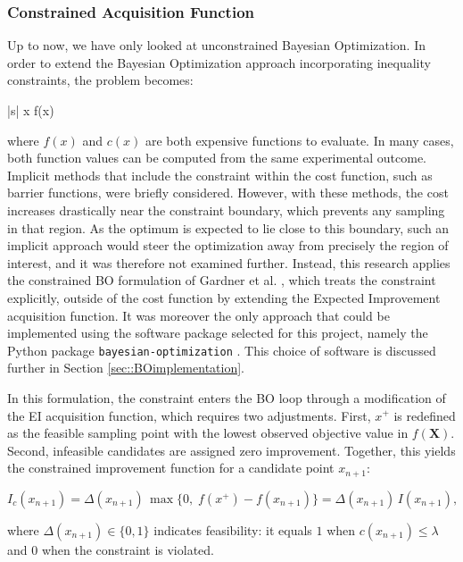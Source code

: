 \subsubsection{Constrained Acquisition Function}\label{sec::constacq}
Up to now, we have only looked at unconstrained Bayesian Optimization. In order to extend the Bayesian Optimization approach incorporating inequality constraints, the problem becomes:
\begin{mini!}|s|
  {x}
  {f(x)}
  {}
  {}
\end{mini!}
where $f(x)$ and $c(x)$ are both expensive functions to evaluate. In many cases, both function values can be computed from the same experimental outcome. Implicit methods that include the constraint within the cost function, such as barrier functions, were briefly considered. However, with these methods, the cost increases drastically near the constraint boundary, which prevents any sampling in that region. As the optimum is expected to lie close to this boundary, such an implicit approach would steer the optimization away from precisely the region of interest, and it was therefore not examined further. Instead, this research applies the constrained BO formulation of Gardner et al. \cite{gardner2014bayesian}, which treats the constraint explicitly, outside of the cost function by extending the Expected Improvement acquisition function. It was moreover the only approach that could be implemented using the software package selected for this project, namely the Python package \texttt{bayesian-optimization} \cite{BOpackage}. This choice of software is discussed further in Section \ref{sec::BOimplementation}.

In this formulation, the constraint enters the BO loop through a modification of the EI acquisition function, which requires two adjustments. First, $x^+$ is redefined as the feasible sampling point with the lowest observed objective value in $f(\boldsymbol{X})$. Second, infeasible candidates are assigned zero improvement. Together, this yields the constrained improvement function for a candidate point $x_{n+1}$:

\begin{equation}
    I_c(x_{n+1}) = \Delta(x_{n+1})\, \max\{0,\; f(x^+) - f(x_{n+1})\} = \Delta(x_{n+1})\, I(x_{n+1}),
\end{equation}

where $\Delta(x_{n+1}) \in \{0,1\}$ indicates feasibility: it equals $1$ when $c(x_{n+1}) \leq \lambda$ and $0$ when the constraint is violated.

